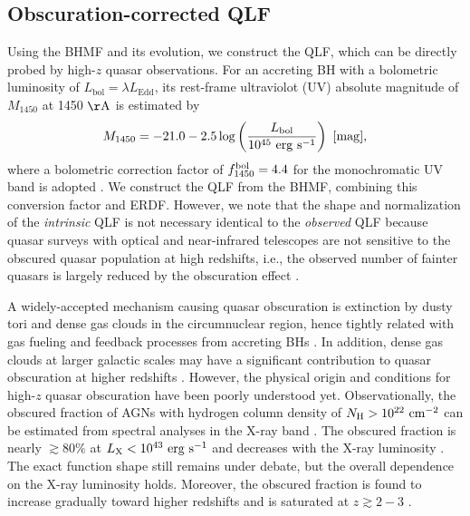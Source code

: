 \documentclass[twocolumn, twocolappendix]{aastex63}
\newcommand{\Muv}{M_{1450}}
\newcommand{\Lbol}{L_\mathrm{bol}}
\begin{document}
\begin{CJK*}{UTF8}{gbsn}
\vspace{2mm}
\subsection{Obscuration-corrected QLF}\label{sec:LF}

Using the BHMF and its evolution, we construct the QLF, which can be directly probed by high-$z$ quasar observations.
For an accreting BH with a bolometric luminosity of $\Lbol=\lambda L_\mathrm{Edd}$, 
its rest-frame ultraviolot (UV) absolute magnitude of $\Muv$ at 1450 $\mathrm{\AA}$ is estimated by
%
\begin{equation}
  \label{eq:M1450}
  \Muv= -21.0-2.5 \log  \left(\frac{\Lbol}{10^{45}~\mathrm{erg~s}^{-1}} \right) ~[\rm{mag}],
\end{equation}
%
where a bolometric correction factor of $f^{\rm bol}_{1450}=4.4$ for the monochromatic UV band is adopted
\citep{2006ApJS..166..470R}.
We construct the QLF from the BHMF, combining this conversion factor and ERDF.
However, we note that the shape and normalization of the {\it intrinsic} QLF is not necessary identical to the {\it observed} QLF
because quasar surveys with optical and near-infrared telescopes are not sensitive to the obscured quasar population at high redshifts,
i.e., the observed number of fainter quasars is largely reduced by the obscuration effect
\citep{2003ApJ...598..886U,2007A&A...463...79G,2008A&A...490..905H,2014ApJ...786..104U,2014MNRAS.437.3550M}. 


A widely-accepted mechanism causing quasar obscuration is extinction by dusty tori and dense gas clouds 
in the circumnuclear region, hence tightly related with gas fueling and feedback processes from accreting BHs 
\citep[see][for a review]{2018ARA&A..56..625H}.
In addition, dense gas clouds at larger galactic scales may have a significant contribution to quasar obscuration at 
higher redshifts \citep{2020MNRAS.495.2135N}.
However, the physical origin and conditions for high-$z$ quasar obscuration have been poorly understood yet.
Observationally, the obscured fraction of AGNs with hydrogen column density of $N_{\rm H}>10^{22}~{\rm cm}^{-2}$
can be estimated from spectral analyses in the X-ray band
\citep[e.g.,][]{2003ApJ...598..886U,2007A&A...463...79G,2008A&A...490..905H}. 
The obscured fraction is nearly $\gtrsim 80\%$ at $L_{\rm X}<10^{43}~{\rm erg~s}^{-1}$ and 
decreases with the X-ray luminosity \citep{2014ApJ...786..104U,2014MNRAS.437.3550M}.
The exact function shape still remains under debate, but the overall dependence on the X-ray luminosity holds.
Moreover, the obscured fraction is found to increase gradually toward higher redshifts and is saturated at $z\gtrsim 2-3$
\citep{2008A&A...490..905H,2014ApJ...786..104U,2014MNRAS.437.3550M,2018MNRAS.473.2378V,2022arXiv220603508G}.



\end{CJK*}
\end{document}

